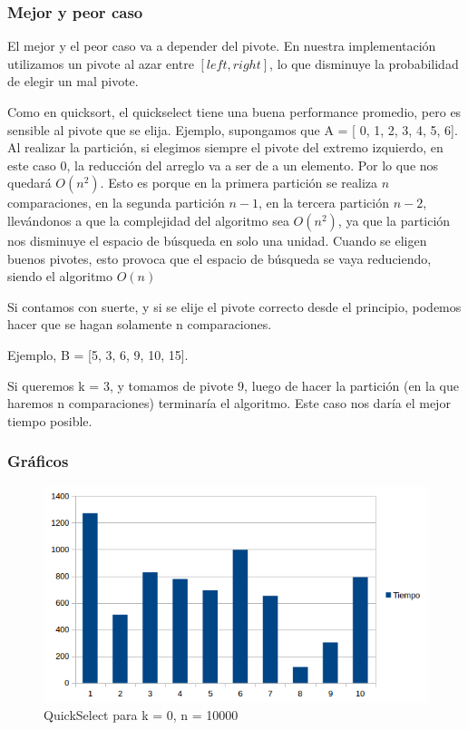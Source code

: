 \subsubsection{Mejor y peor caso}
El mejor y el peor caso va a depender del pivote. En nuestra implementación utilizamos un pivote al azar entre $[left, right]$, lo que disminuye la probabilidad de elegir un mal pivote.

Como en quicksort, el quickselect tiene una buena performance promedio, pero es sensible al pivote que se elija.
Ejemplo, supongamos que A = [ 0, 1, 2, 3, 4, 5, 6].
Al realizar la partición, si elegimos siempre el pivote del extremo izquierdo, en este caso 0, la reducción del arreglo va a ser de a un elemento. Por lo que nos quedará $O(n^2)$. Esto es porque en la primera partición se realiza $n$ comparaciones, en la segunda partición $n-1$, en la tercera partición $n-2$, llevándonos a que la complejidad del algoritmo sea $O(n^2)$, ya que la partición nos disminuye el espacio de búsqueda en solo una unidad.
Cuando se eligen buenos pivotes, esto provoca que el espacio de búsqueda se vaya reduciendo, siendo el algoritmo $O(n)$ \cite{WIKIPEDIA_QUICKSELECT}

Si contamos con suerte, y si se elije el pivote correcto desde el principio, podemos hacer que se hagan solamente n comparaciones. 

Ejemplo, B = [5, 3, 6, 9, 10, 15].

Si queremos k = 3, y tomamos de pivote 9, luego de hacer la partición (en la que haremos n comparaciones) terminaría el algoritmo. Este caso nos daría el mejor tiempo posible.

\subsubsection{Gráficos}
\begin{figure}[H]
\centering
\includegraphics[width=\textwidth]{KZero/QuickSelectK0.png}
\caption{QuickSelect para k = 0, n = 10000}
\end{figure}

